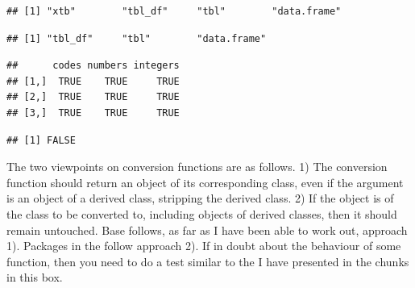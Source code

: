 \documentclass[krantz2]{krantz}\usepackage{knitr}%
\begin{document}
\begin{explainbox}
\begin{knitrout}\footnotesize
{}\color{fgcolor}\begin{kframe}
\begin{alltt}
 \hlkwb{<-} 
 \hlkwb{<-} \hlstd{(}\hlstd{,} 
\end{alltt}
\begin{verbatim}
## [1] "xtb"        "tbl_df"     "tbl"        "data.frame"
\end{verbatim}
\begin{alltt}
 \hlkwb{<-} 
\end{alltt}
\begin{verbatim}
## [1] "tbl_df"     "tbl"        "data.frame"
\end{verbatim}
\begin{alltt}
 \hlopt{==} 
\end{alltt}
\begin{verbatim}
##      codes numbers integers
## [1,]  TRUE    TRUE     TRUE
## [2,]  TRUE    TRUE     TRUE
## [3,]  TRUE    TRUE     TRUE
\end{verbatim}
\begin{alltt}
\end{alltt}
\begin{verbatim}
## [1] FALSE
\end{verbatim}
\end{kframe}
\end{knitrout}

The two viewpoints on conversion functions are as follows. 1) The conversion function should return an object of its corresponding class, even if the argument is an object of a derived class, stripping the derived class. 2) If the object is of the class to be converted to, including objects of derived classes, then it should remain untouched. Base \Rlang follows, as far as I have been able to work out, approach 1). Packages in the  follow approach 2). If in doubt about the behaviour of some function, then you need to do a test similar to the I have presented in the chunks in this box.
\end{explainbox}
\end{document}
